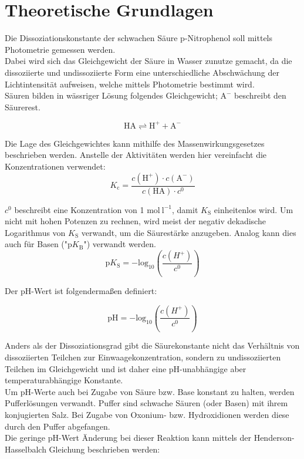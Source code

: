 \documentclass[12pt,a4paper,titlepage,headinclude,bibtotoc]{scrartcl}
\begin{document}
\tableofcontents

\newpage

\section{Theoretische Grundlagen}

Die Dissoziationskonstante der schwachen Säure p-Nitrophenol soll mittels Photometrie gemessen werden. \\
Dabei wird sich das Gleichgewicht der Säure in Wasser zunutze gemacht, da die dissoziierte und undissoziierte Form eine unterschiedliche Abschwächung der Lichtintensität aufweisen, welche mittels Photometrie bestimmt wird.\\

Säuren bilden in wässriger Lösung folgendes Gleichgewicht; $\mathrm{A^-}$ beschreibt den Säurerest.

\begin{equation}
\mathrm{HA}  \rightleftharpoons \mathrm{H^+} + \mathrm{A^-}
\end{equation}

Die Lage des Gleichgewichtes kann mithilfe des Massenwirkungsgesetzes beschrieben werden. Anstelle der Aktivitäten werden hier vereinfacht die Konzentrationen verwendet:\\

\begin{equation}
K_\mathrm{c} =\frac{c(\mathrm{H^+}) \cdot c\mathrm{(A^-)}}{c\mathrm{(HA)} \cdot c^0}
\end{equation}

$c^0$ beschreibt eine Konzentration von 1 $\mathrm{mol{~}l^{-1}}$, damit $K_\mathrm{S}$ einheitenlos wird. Um nicht mit hohen Potenzen zu rechnen, wird meist der negativ dekadische Logarithmus von $K_\mathrm{S}$ verwandt, um die Säurestärke anzugeben. Analog kann dies auch für Basen ("$\mathrm{p}K_\mathrm{B}$") verwandt werden.\\

\begin{equation}
\mathrm{p}K_\mathrm{S} = \mathrm{-log_{10}} \left(\frac{c(H^+)}{c^0}\right)
\end{equation}

Der pH-Wert ist folgendermaßen definiert:

\begin{equation}
\mathrm{pH}= \mathrm{-log}_{10}\left(\frac{c(H^+)}{c^0}\right)
\end{equation}

Anders als der Dissoziationsgrad gibt die Säurekonstante nicht das Verhältnis von dissoziierten Teilchen zur Einwaagekonzentration, sondern zu undissoziierten Teilchen im Gleichgewicht und ist daher eine pH-unabhängige aber temperaturabhängige Konstante.\\
Um pH-Werte auch bei Zugabe von Säure bzw. Base konstant zu halten, werden Pufferlösungen verwandt. Puffer sind schwache Säuren (oder Basen) mit ihrem konjugierten Salz. Bei Zugabe von Oxonium- bzw. Hydroxidionen werden diese durch den Puffer abgefangen.\\
Die geringe pH-Wert Änderung bei dieser Reaktion kann mittels der Henderson-Hasselbalch Gleichung beschrieben werden:\\
\end{document}
